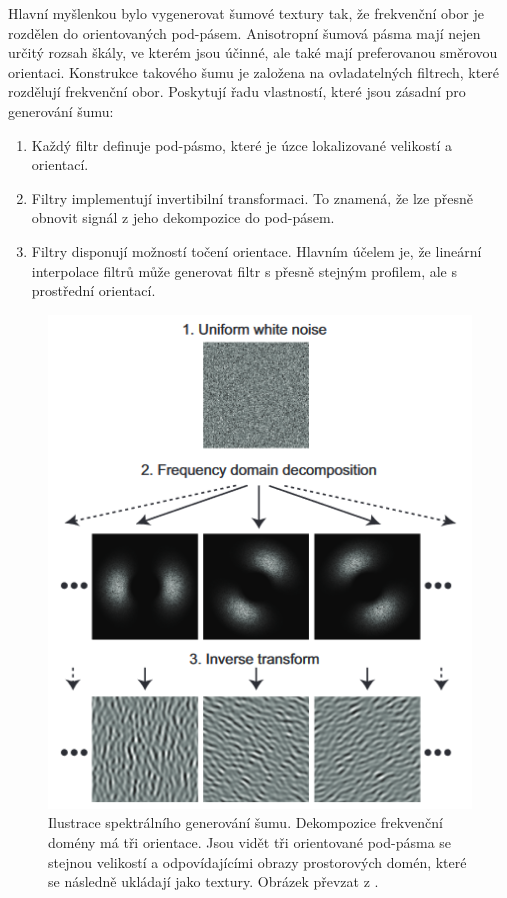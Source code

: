 Hlavní myšlenkou bylo vygenerovat šumové textury tak, že frekvenční obor je rozdělen do orientovaných pod-pásem. Anisotropní šumová pásma mají nejen určitý rozsah škály, ve kterém jsou účinné, ale také mají preferovanou směrovou orientaci. Konstrukce takového šumu je založena na ovladatelných filtrech, které rozdělují frekvenční obor. Poskytují řadu vlastností, které jsou zásadní pro generování šumu:
\begin{enumerate}
	\item Každý filtr definuje pod-pásmo, které je úzce lokalizované velikostí a orientací.
	\item Filtry implementují invertibilní transformaci. To znamená, že lze přesně obnovit signál z jeho dekompozice do pod-pásem.
	\item Filtry disponují možností točení orientace. Hlavním účelem je, že lineární interpolace filtrů může generovat filtr s přesně stejným profilem, ale s prostřední orientací.
\end{enumerate}

\begin{figure}[H]
	\centering
	\includegraphics[scale=0.8]{obrazky-figures/AnisotropicNoise.png}
	\caption{Ilustrace spektrálního generování šumu. Dekompozice frekvenční domény má tři orientace. Jsou vidět tři orientované pod-pásma se stejnou velikostí a odpovídajícími obrazy prostorových domén, které se následně ukládají jako textury. Obrázek převzat z \cite{Goldberg08}.}
	\label{fig:AnisotropicNoise}
\end{figure}


